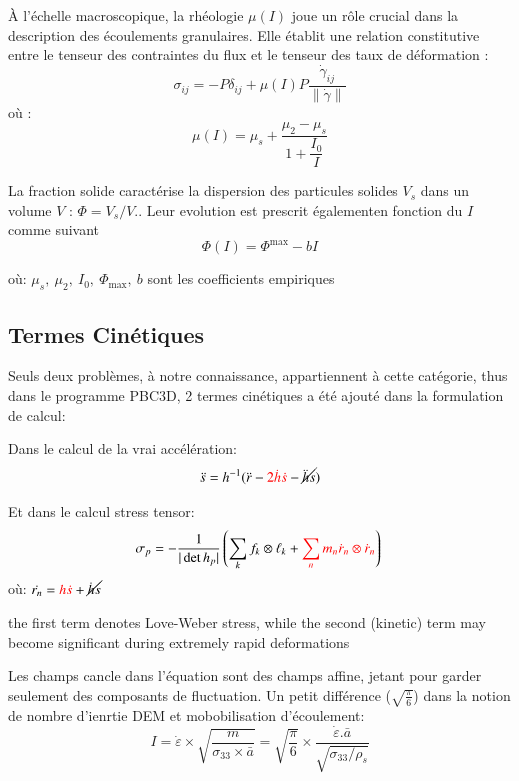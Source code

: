 \documentclass[5p,authoryear,square]{elsarticle}
\begin{document}
À l'échelle macroscopique, la rhéologie $\mu(I)$ joue un rôle crucial dans la description des écoulements granulaires. Elle établit une relation constitutive entre le tenseur des contraintes du flux et le tenseur des taux de déformation  \cite{jop2006constitutive} :
\begin{equation}
\sigma_{ij} = -P \delta_{ij} + \mu(I) P \frac{\dot{\gamma}_{ij}}{\lVert \dot{\gamma} \rVert}
\label{flowTensor}
\end{equation}
où :
\begin{equation}
\mu(I) = \mu_s + \dfrac{\mu_2 - \mu_s}{1 + \dfrac{I_0}{I}}
\label{muI}
\end{equation}

La fraction solide caractérise la dispersion des particules solides $V_s$ dans un volume $V$ : $\Phi = V_s/V$..  
Leur evolution est prescrit égalementen fonction du $I$ comme suivant  
\begin{equation}
\Phi(I) = \Phi^{\max} - bI
\label{phiI}
\end{equation}

où: $\mu_s,\ \mu_2,\ I_0,\ \Phi_{\text{max}},\ b $ sont les coefficients empiriques

\subsection{Termes Cinétiques}\label{termeCinetique}
Seuls deux problèmes, à notre connaissance, appartiennent à cette catégorie, 
thus dans le programme PBC3D, 2 termes cinétiques a été ajouté  dans la formulation de calcul:


Dans le calcul de la vrai accélération: 
\begin{equation}
\ddot{s} = h^{-1}(\ddot{r} - \textcolor{red}{2\dot{h}\dot{s}} - \cancel{\ddot{h}s})
    \label{vraiAcc}
\end{equation}	


Et dans le calcul stress tensor: 
\begin{equation}
    \sigma_p = -\frac{1}{|\det h_p|} \left( \sum_k f_k \otimes \ell_k + \textcolor{red}{\sum_n m_n \dot{r}_n \otimes \dot{r}_n} \right) \\
    \label{contrainteDynamique}
\end{equation}	
    où: $\dot{r_n} = \textcolor{red}{h\dot{s}} + \cancel{\dot{h}s}$

the first term denotes Love-Weber stress, while the
second (kinetic) term may become significant during extremely rapid deformations

Les champs cancle dans l'équation sont des champs affine, jetant pour garder seulement des composants de fluctuation.
Un petit différence ($\sqrt{\frac{\pi}{6}}$) dans la notion de nombre d'ienrtie DEM et mobobilisation d'écoulement:
\begin{equation}
    I = \dot{\varepsilon} \times \sqrt{\frac{m}{\sigma_{33} \times \bar{a}}}
 = \sqrt{\frac{\pi}{6}} \times \frac{\dot{\varepsilon} .\bar{a}}{\sqrt{\sigma_{33}/\rho_s}}
    \label{comparerO}
\end{equation}
\end{document}
